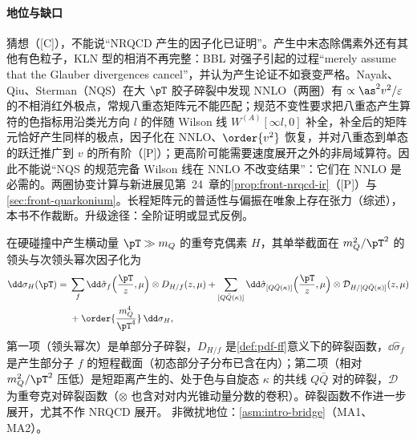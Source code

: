 \paragraph{地位与缺口}
猜想（[C]），不能说“NRQCD 产生的因子化已证明”。产生中末态除偶素外还有其他有色粒子，KLN 型的相消不再完整：BBL 对强子引起的过程“merely assume that the Glauber divergences cancel”，并认为产生论证不如衰变严格\cite[第~VI.A~节]{BodwinBraatenLepage1995}。Nayak、Qiu、Sterman（NQS）在大 $\pT$ 胶子碎裂中发现 NNLO（两圈）有 $\propto\as^2v^2/\varepsilon$ 的不相消红外极点，常规八重态矩阵元不能匹配；规范不变性要求把八重态产生算符的色指标用沿类光方向 $l$ 的伴随 Wilson 线 $W^{(A)}[\infty l,0]$ 补全，补全后的矩阵元恰好产生同样的极点，因子化在 NNLO、$\order{v^2}$ 恢复\cite{NayakQiuSterman2005a,NayakQiuSterman2005b}，并对八重态到单态的跃迁推广到 $v$ 的所有阶\cite{NayakQiuSterman2006}（[P]）；更高阶可能需要速度展开之外的非局域算符\cite{NayakQiuSterman2005a}。因此不能说“NQS 的规范完备 Wilson 线在 NNLO 不改变结果”：它们在 NNLO 是必需的。两圈协变计算与新进展见第~24~章的\cref{prop:front-nrqcd-ir}（[P]）与\cref{sec:front-quarkonium}。长程矩阵元的普适性与偏振在唯象上存在张力\cite{Butenschoen:2010rq,Butenschoen:2011yh,Butenschoen:2012px,Chao:2012iv}（综述\cite{BrambillaEtAl2011,Lansberg:2019adr}），本书不作裁断。升级途径：全阶证明或显式反例。

\begin{proposition}\label{prop:heavy-quarkonium-fragmentation}
在硬碰撞中产生横动量 $\pT\gg m_Q$ 的重夸克偶素 $H$，其单举截面在 $m_Q^2/\pT^2$ 的领头与次领头幂次因子化为
\begin{equation}\label{eq:heavy-frag}
\begin{split}
\dd\sigma_{H}(\pT)={}&\sum_f\dd\hat\sigma_{f}\Big(\frac{\pT}{z},\mu\Big)\otimes D_{H/f}(z,\mu)
+\sum_{[Q\bar Q(\kappa)]}\dd\hat\sigma_{[Q\bar Q(\kappa)]}\Big(\frac{\pT}{z},\mu\Big)\otimes\mathcal D_{H/[Q\bar Q(\kappa)]}(z,\mu)\\
&+\order{\frac{m_Q^4}{\pT^4}}\,\dd\sigma_H ,
\end{split}
\end{equation}
第一项（领头幂次）是单部分子碎裂，$D_{H/f}$ 是\cref{def:pdf-ff}意义下的碎裂函数，$\dd\hat\sigma_f$ 是产生部分子 $f$ 的短程截面（初态部分子分布已含在内）；第二项（相对 $m_Q^2/\pT^2$ 压低）是短距离产生的、处于色与自旋态 $\kappa$ 的共线 $Q\bar Q$ 对的碎裂，$\mathcal D$ 为重夸克对碎裂函数（$\otimes$ 也含对对内光锥动量分数的卷积）。碎裂函数不作进一步展开，尤其不作 NRQCD 展开。
非微扰地位：\cref{asm:intro-bridge}（MA1、MA2）。
\end{proposition}


